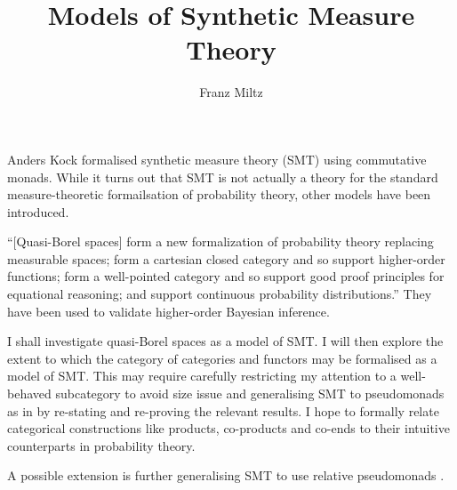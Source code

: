 \documentclass{article}
\begin{document}
\title{Models of Synthetic Measure Theory}
\author{Franz Miltz}
\maketitle

Anders Kock formalised synthetic measure theory (SMT) using commutative monads. \cite{kock2011commutative}
While it turns out that SMT is not actually a theory for the standard measure-theoretic formailsation of probability theory,
other models have been introduced.

\enquote{[Quasi-Borel spaces] form a new formalization of probability theory replacing measurable spaces; form a cartesian
closed category and so support higher-order functions; form a well-pointed category and so support good proof principles 
for equational reasoning; and support continuous probability distributions.} \cite{DBLP:journals/corr/HeunenKSY17} They have been used to validate 
higher-order Bayesian inference. \cite{DBLP:journals/corr/abs-1711-03219}

I shall investigate quasi-Borel spaces as a model of SMT. I will then explore the extent to which
the category of categories and functors may be formalised as a model of SMT. This may require carefully restricting 
my attention to a well-behaved subcategory to avoid size issue and generalising SMT to pseudomonads as in \cite{Marmolejo_no-iterationpseudomonads}
by re-stating and re-proving the relevant results. I hope to formally relate categorical constructions like products, co-products 
and co-ends to their intuitive counterparts in probability theory. 

A possible extension is further generalising SMT to use relative pseudomonads \cite{Fiore_relative-pseudomonads2017}.

{}

\end{document}
